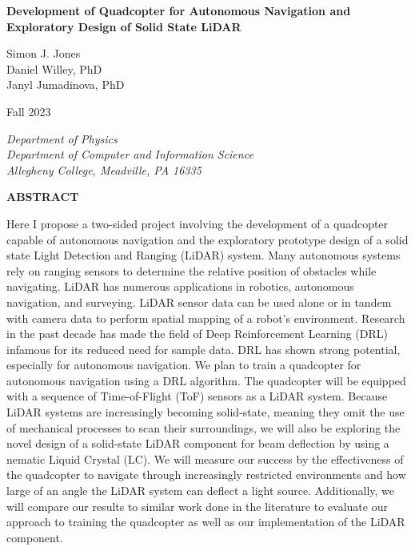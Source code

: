 \documentclass[12pt]{article}
\begin{document}
\vspace*{1in} %
\begin{center}
\large{
  \textbf{Development of Quadcopter for Autonomous Navigation and Exploratory Design of Solid State LiDAR}
}
\end{center}

\vspace{1in}

\begin{center}
Simon J. Jones \\
Daniel Willey, PhD \\
Janyl Jumadinova, PhD
\end{center}

\vspace{1in}

\begin{center}
Fall 2023
\end{center}

\vspace{1in}

\begin{center}
\textit{Department of Physics} \\
\textit{Department of Computer and Information Science} \\
\textit{Allegheny College, Meadville, PA 16335}
\end{center}

\newpage

\begin{center}\small{\textbf{ABSTRACT}}\end{center}
\noindent
Here I propose a two-sided project involving the development of a quadcopter capable of autonomous navigation and the exploratory prototype design of a solid state Light Detection and Ranging (LiDAR) system. Many autonomous systems rely on ranging sensors to determine the relative position of obstacles while navigating. LiDAR has numerous applications in robotics, autonomous navigation, and surveying. LiDAR sensor data can be used alone or in tandem with camera data to perform spatial mapping of a robot's environment. \autocite{raj2020} Research in the past decade has made the field of Deep Reinforcement Learning (DRL) infamous for its reduced need for sample data. \autocite{zhu2021} DRL has shown strong potential, especially for autonomous navigation. \autocite{hodge2021} We plan to train a quadcopter for autonomous navigation using a DRL algorithm. The quadcopter will be equipped with a sequence of Time-of-Flight (ToF) sensors as a LiDAR system. Because LiDAR systems are increasingly becoming solid-state, meaning they omit the use of mechanical processes to scan their surroundings,\autocite{li2022} we will also be exploring the novel design of a solid-state LiDAR component for beam deflection by using a nematic Liquid Crystal (LC). We will measure our success by the effectiveness of the quadcopter to navigate through increasingly restricted environments and how large of an angle the LiDAR system can deflect a light source. Additionally, we will compare our results to similar work done in the literature to evaluate our approach to training the quadcopter as well as our implementation of the LiDAR component.
\end{document}

